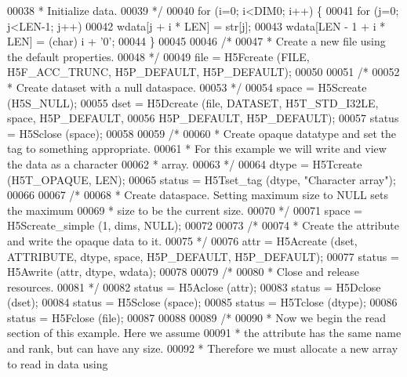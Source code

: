 \begin{DoxyCode}
00038 \textcolor{comment}{     * Initialize data.}
00039 \textcolor{comment}{     */}
00040     \textcolor{keywordflow}{for} (i=0; i<DIM0; i++) \{
00041         \textcolor{keywordflow}{for} (j=0; j<LEN-1; j++)
00042             wdata[j + i * LEN] = str[j];
00043         wdata[LEN - 1 + i * LEN] = (char) i + \textcolor{charliteral}{'0'};
00044     \}
00045 
00046     \textcolor{comment}{/*}
00047 \textcolor{comment}{     * Create a new file using the default properties.}
00048 \textcolor{comment}{     */}
00049     file = H5Fcreate (FILE, H5F\_ACC\_TRUNC, H5P\_DEFAULT, H5P\_DEFAULT);
00050 
00051     \textcolor{comment}{/*}
00052 \textcolor{comment}{     * Create dataset with a null dataspace.}
00053 \textcolor{comment}{     */}
00054     space = H5Screate (H5S\_NULL);
00055     dset = H5Dcreate (file, DATASET, H5T\_STD\_I32LE, space, H5P\_DEFAULT,
00056                 H5P\_DEFAULT, H5P\_DEFAULT);
00057     status = H5Sclose (space);
00058 
00059     \textcolor{comment}{/*}
00060 \textcolor{comment}{     * Create opaque datatype and set the tag to something appropriate.}
00061 \textcolor{comment}{     * For this example we will write and view the data as a character}
00062 \textcolor{comment}{     * array.}
00063 \textcolor{comment}{     */}
00064     dtype = H5Tcreate (H5T\_OPAQUE, LEN);
00065     status = H5Tset\_tag (dtype, \textcolor{stringliteral}{"Character array"});
00066 
00067     \textcolor{comment}{/*}
00068 \textcolor{comment}{     * Create dataspace.  Setting maximum size to NULL sets the maximum}
00069 \textcolor{comment}{     * size to be the current size.}
00070 \textcolor{comment}{     */}
00071     space = H5Screate\_simple (1, dims, NULL);
00072 
00073     \textcolor{comment}{/*}
00074 \textcolor{comment}{     * Create the attribute and write the opaque data to it.}
00075 \textcolor{comment}{     */}
00076     attr = H5Acreate (dset, ATTRIBUTE, dtype, space, H5P\_DEFAULT, H5P\_DEFAULT);
00077     status = H5Awrite (attr, dtype, wdata);
00078 
00079     \textcolor{comment}{/*}
00080 \textcolor{comment}{     * Close and release resources.}
00081 \textcolor{comment}{     */}
00082     status = H5Aclose (attr);
00083     status = H5Dclose (dset);
00084     status = H5Sclose (space);
00085     status = H5Tclose (dtype);
00086     status = H5Fclose (file);
00087 
00088 
00089     \textcolor{comment}{/*}
00090 \textcolor{comment}{     * Now we begin the read section of this example.  Here we assume}
00091 \textcolor{comment}{     * the attribute has the same name and rank, but can have any size.}
00092 \textcolor{comment}{     * Therefore we must allocate a new array to read in data using}

\end{DoxyCode}
